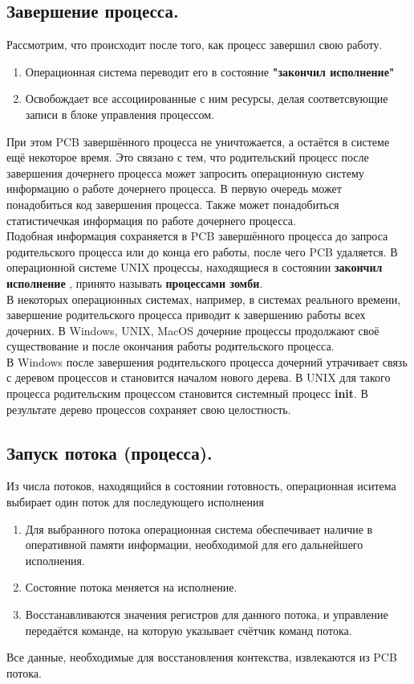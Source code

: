 \documentclass[a4paper]{article}
\begin{document}
\subsection{Завершение процесса.}
Рассмотрим, что происходит после того, как процесс завершил свою работу.
\begin{enumerate}
        \item Операционная система переводит его в состояние \textbf{"закончил исполнение"}
	\item Освобождает все ассоциированные с ним ресурсы, делая соответсвующие записи в блоке управления процессом.
\end{enumerate}
При этом PCB завершённого процесса не уничтожается, а остаётся в системе ещё некоторое время. Это связано с тем, что родительский процесс после завершения дочернего процесса может запросить операционную систему информацию о работе дочернего процесса. В первую очередь может понадобиться код завершения процесса. Также может понадобиться статистичечкая информация по работе дочернего процесса.\\
Подобная информация сохраняется в PCB завершённого процесса до запроса родительского процесса или до конца его работы, после чего PCB удаляется. В операционной системе UNIX процессы, находящиеся в состоянии \textbf{закончил исполнение} , принято называть \textbf{процессами зомби}.\\
В некоторых операционных системах, например, в системах реального времени, завершение родительского процесса приводит к завершению работы всех дочерних. В Windows, UNIX, MacOS дочерние процессы продолжают своё существование и после окончания работы родительского процесса.\\
В Windows после завершения родительского процесса дочерний утрачивает связь с деревом процессов и становится началом нового дерева.
В UNIX для такого процесса родительским процессом становится системный процесс \textbf{init}. В результате дерево процессов сохраняет свою целостность. 
\subsection{Запуск потока (процесса).}
Из числа потоков, находящийся в состоянии готовность, операционная иситема выбирает один поток для последующего исполнения
\begin{enumerate}
        \item Для выбранного потока операционная система обеспечивает наличие в оперативной памяти информации, необходимой для его дальнейшего исполнения.
	\item Состояние потока меняется на исполнение.
	\item Восстанавливаются значения регистров для данного потока, и управление передаётся команде, на которую указывает счётчик команд потока.
\end{enumerate}
Все данные, необходимые для восстановления контекства, извлекаются из PCB потока.
\end{document}
